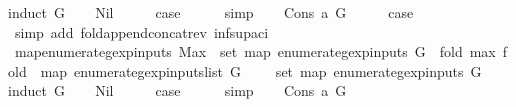 \begin{isabellebody}
%
\isadelimproof
%
\endisadelimproof
%
\isatagproof
{}\isamarkupfalse%
{\isacharparenleft}induct\ G{\isacharparenright}\isanewline
\ \ \isamarkupfalse%
\ Nil\isanewline
\ \ \isamarkupfalse%
\ \isamarkupfalse%
\ {\isacharquery}case\isanewline
\ \ \ \ \isamarkupfalse%
\ simp\isanewline
{}\isamarkupfalse%
\isanewline
\ \ \isamarkupfalse%
\ {\isacharparenleft}Cons\ a\ G{\isacharparenright}\isanewline
\ \ \isamarkupfalse%
\ \isamarkupfalse%
\ {\isacharquery}case\isanewline
\ \ \ \ \isamarkupfalse%
\ {\isacharparenleft}simp\ add{\isacharcolon}\ fold{\isacharunderscore}append{\isacharunderscore}concat{\isacharunderscore}rev\ inf{\isacharunderscore}sup{\isacharunderscore}aci{\isacharparenleft}{}{\isacharparenright}{\isacharparenright}\isanewline
{}\isamarkupfalse%
%
\endisatagproof
{\isafoldproof}%
%
\isadelimproof
\isanewline
%
\endisadelimproof
\isanewline
{}\isamarkupfalse%
\ map{\isacharunderscore}enumerate{\isacharunderscore}gexp{\isacharunderscore}inputs{\isacharcolon}\ {\isachardoublequoteopen}{\isacharparenleft}Max\ {\isacharparenleft}{\isasymUnion}\ set\ {\isacharparenleft}map\ enumerate{\isacharunderscore}gexp{\isacharunderscore}inputs\ G{\isacharparenright}{\isacharparenright}\ {\isacharequal}\ {\isacharparenleft}fold\ {\isacharparenleft}max{\isacharparenright}\ {\isacharparenleft}fold\ {\isacharparenleft}{\isacharat}{\isacharparenright}\ {\isacharparenleft}map\ enumerate{\isacharunderscore}gexp{\isacharunderscore}inputs{\isacharunderscore}list\ G{\isacharparenright}\ {\isacharbrackleft}{\isacharbrackright}{\isacharparenright}\ {}{\isacharparenright}{\isacharparenright}\ {\isasymor}\ {\isacharparenleft}{\isacharparenleft}{\isasymUnion}\ set\ {\isacharparenleft}map\ enumerate{\isacharunderscore}gexp{\isacharunderscore}inputs\ G{\isacharparenright}{\isacharparenright}\ {\isacharequal}\ {\isacharbraceleft}{\isacharbraceright}{\isacharparenright}{\isachardoublequoteclose}\isanewline
%
\isadelimproof
%
\endisadelimproof
%
\isatagproof
{}\isamarkupfalse%
{\isacharparenleft}induct\ G{\isacharparenright}\isanewline
\ \ \isamarkupfalse%
\ Nil\isanewline
\ \ \isamarkupfalse%
\ \isamarkupfalse%
\ {\isacharquery}case\isanewline
\ \ \ \ \isamarkupfalse%
\ simp\isanewline
{}\isamarkupfalse%
\isanewline
\ \ \isamarkupfalse%
\ {\isacharparenleft}Cons\ a\ G{\isacharparenright}\isanewline

\end{isabellebody}
